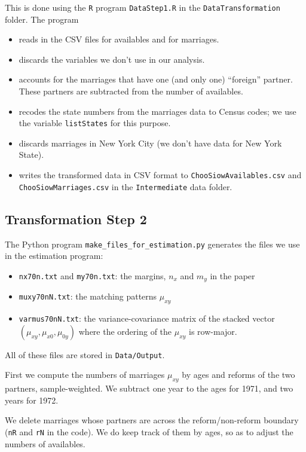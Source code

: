 \documentclass[11pt]{article}
\theoremstyle{plain}
\theoremstyle{definition}
\begin{document}
 
This is done using the \verb|R| program \verb|DataStep1.R| in the \verb|DataTransformation| folder.  The program 
\begin{itemize}
    \item reads in the CSV files for availables and for marriages.
    \item discards the variables we don't use in our analysis.
    \item  accounts for the marriages that have one (and only one) ``foreign'' partner.
    These partners are subtracted from the number of availables.
    \item recodes the state numbers from the marriages data to Census codes; we use the variable \verb|listStates| for this purpose.
    \item discards marriages in New York City (we don't have data for New York State).
    \item writes the transformed data in CSV format to \verb|ChooSiowAvailables.csv| and \verb|ChooSiowMarriages.csv| in the \verb|Intermediate| data folder.
\end{itemize}




\subsection{Transformation  Step 2}
The Python program \verb|make_files_for_estimation.py| generates the files we use  in the estimation program:
\begin{itemize}
    \item \verb|nx70n.txt| and \verb|my70n.txt|: the margins, $n_x$ and $m_y$ in the paper
    \item  \verb|muxy70nN.txt|: the matching patterns $\mu_{xy}$
    \item \verb|varmus70nN.txt|: the variance-covariance matrix of the stacked vector $(\mu_{xy},\mu_{x0}, \mu_{0y})$ where the ordering of the $\mu_{xy}$ is row-major.
\end{itemize}
All of these files are stored in \verb|Data/Output|.

First we compute the numbers of marriages $\mu_{xy}$ by ages and reforms of the two partners, sample-weighted. We subtract one year to the ages for 1971, and two years for 1972.

 We delete marriages whose partners are across the reform/non-reform boundary (\texttt{nR} and \texttt{rN} in the code). We do keep track of them by ages, so as to adjust the numbers of availables. 
 
\end{document}
